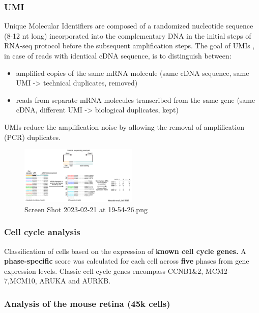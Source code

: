 \hypertarget{umi}{%
\subsubsection{UMI}\label{umi}}

Unique Molecular Identifiers are composed of a randomized nucleotide
sequence (8-12 nt long) incorporated into the complementary DNA in the
initial steps of RNA-seq protocol before the subsequent amplification
steps. The goal of UMIs , in case of reads with identical cDNA sequence,
is to distinguish between:

\begin{itemize}
\tightlist
\item
  amplified copies of the same mRNA molecule (same cDNA sequence, same
  UMI -\textgreater{} technical duplicates, removed)
\item
  reads from separate mRNA molecules transcribed from the same gene
  (same cDNA, different UMI -\textgreater{} biological duplicates, kept)
\end{itemize}

UMIs reduce the amplification noise by allowing the removal of
amplification (PCR) duplicates.

\begin{figure}
\centering
\includegraphics[width=0.5\textwidth]{images/Screen_Shot_2023-02-21_at_19-54-26.png}
\caption{Screen Shot 2023-02-21 at 19-54-26.png}
\end{figure}

\hypertarget{cell-cycle-analysis}{%
\subsubsection{Cell cycle analysis}\label{cell-cycle-analysis}}

Classification of cells based on the expression of \textbf{known cell
cycle genes.} A \textbf{phase-specific} score was calculated for each
cell across \textbf{five} phases from gene expression levels. Classic
cell cycle genes encompass CCNB1\&2, MCM2-7,MCM10, ARUKA and AURKB.

\hypertarget{analysis-of-the-mouse-retina-45k-cells}{%
\subsubsection{Analysis of the mouse retina (45k
cells)}\label{analysis-of-the-mouse-retina-45k-cells}}

